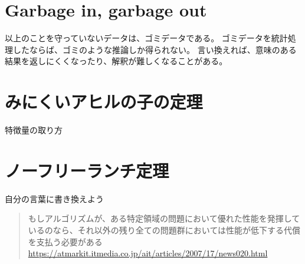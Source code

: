 \section{Garbage in, garbage out}
以上のことを守っていないデータは、ゴミデータである。
ゴミデータを統計処理したならば、ゴミのような推論しか得られない。
言い換えれば、意味のある結果を返しにくくなったり、解釈が難しくなることがある。

\section{みにくいアヒルの子の定理}
特徴量の取り方

\section{ノーフリーランチ定理}

自分の言葉に書き換えよう
\begin{quote}
    もしアルゴリズムが、ある特定領域の問題において優れた性能を発揮しているのなら、それ以外の残り全ての問題群においては性能が低下する代償を支払う必要がある
    \url{https://atmarkit.itmedia.co.jp/ait/articles/2007/17/news020.html}    
\end{quote}
\fi 
